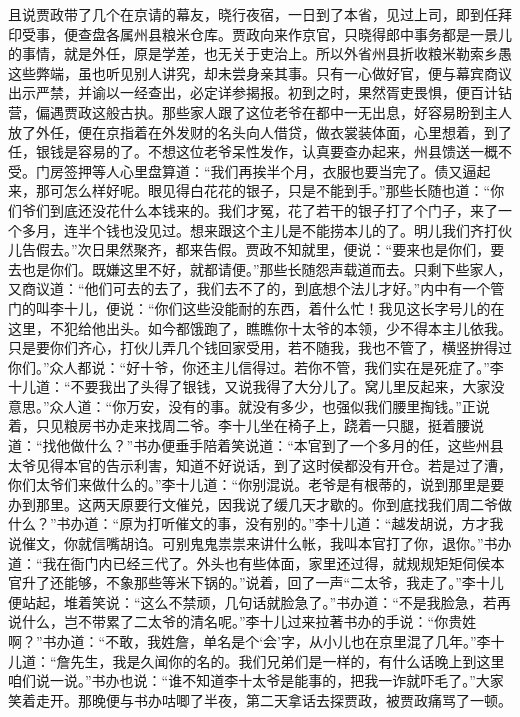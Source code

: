 \begin{parag}
    且说贾政带了几个在京请的幕友，晓行夜宿，一日到了本省，见过上司，即到任拜印受事，便查盘各属州县粮米仓库。贾政向来作京官，只晓得郎中事务都是一景儿的事情，就是外任，原是学差，也无关于吏治上。所以外省州县折收粮米勒索乡愚这些弊端，虽也听见别人讲究，却未尝身亲其事。只有一心做好官，便与幕宾商议出示严禁，并谕以一经查出，必定详参揭报。初到之时，果然胥吏畏惧，便百计钻营，偏遇贾政这般古执。那些家人跟了这位老爷在都中一无出息，好容易盼到主人放了外任，便在京指着在外发财的名头向人借贷，做衣裳装体面，心里想着，到了任，银钱是容易的了。不想这位老爷呆性发作，认真要查办起来，州县馈送一概不受。门房签押等人心里盘算道：“我们再挨半个月，衣服也要当完了。债又逼起来，那可怎么样好呢。眼见得白花花的银子，只是不能到手。”那些长随也道：“你们爷们到底还没花什么本钱来的。我们才冤，花了若干的银子打了个门子，来了一个多月，连半个钱也没见过。想来跟这个主儿是不能捞本儿的了。明儿我们齐打伙儿告假去。”次日果然聚齐，都来告假。贾政不知就里，便说：“要来也是你们，要去也是你们。既嫌这里不好，就都请便。”那些长随怨声载道而去。只剩下些家人，又商议道：“他们可去的去了，我们去不了的，到底想个法儿才好。”内中有一个管门的叫李十儿，便说：“你们这些没能耐的东西，着什么忙！我见这长字号儿的在这里，不犯给他出头。如今都饿跑了，瞧瞧你十太爷的本领，少不得本主儿依我。只是要你们齐心，打伙儿弄几个钱回家受用，若不随我，我也不管了，横竖拚得过你们。”众人都说：“好十爷，你还主儿信得过。若你不管，我们实在是死症了。”李十儿道：“不要我出了头得了银钱，又说我得了大分儿了。窝儿里反起来，大家没意思。”众人道：“你万安，没有的事。就没有多少，也强似我们腰里掏钱。”正说着，只见粮房书办走来找周二爷。李十儿坐在椅子上，跷着一只腿，挺着腰说道：“找他做什么？”书办便垂手陪着笑说道：“本官到了一个多月的任，这些州县太爷见得本官的告示利害，知道不好说话，到了这时侯都没有开仓。若是过了漕，你们太爷们来做什么的。”李十儿道：“你别混说。老爷是有根蒂的，说到那里是要办到那里。这两天原要行文催兑，因我说了缓几天才歇的。你到底找我们周二爷做什么？”书办道：“原为打听催文的事，没有别的。”李十儿道：“越发胡说，方才我说催文，你就信嘴胡诌。可别鬼鬼祟祟来讲什么帐，我叫本官打了你，退你。”书办道：“我在衙门内已经三代了。外头也有些体面，家里还过得，就规规矩矩伺侯本官升了还能够，不象那些等米下锅的。”说着，回了一声“二太爷，我走了。”李十儿便站起，堆着笑说：“这么不禁顽，几句话就脸急了。”书办道：“不是我脸急，若再说什么，岂不带累了二太爷的清名呢。”李十儿过来拉著书办的手说：“你贵姓啊？”书办道：“不敢，我姓詹，单名是个‘会’字，从小儿也在京里混了几年。”李十儿道：“詹先生，我是久闻你的名的。我们兄弟们是一样的，有什么话晚上到这里咱们说一说。”书办也说：“谁不知道李十太爷是能事的，把我一诈就吓毛了。”大家笑着走开。那晚便与书办咕唧了半夜，第二天拿话去探贾政，被贾政痛骂了一顿。
\end{parag}



